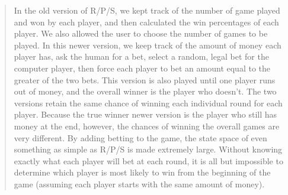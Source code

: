 \documentclass{article}
\begin{document}
\begin{enumerate}
\begin{quote}
In the old version of R/P/S, we kept track of the number of game played and won by each player, and then calculated the win percentages of each player. We also allowed the user to choose the number of games to be played. In this newer version, we keep track of the amount of money each player has, ask the human for a bet, select a random, legal bet for the computer player, then force each player to bet an amount equal to the greater of the two bets. This version is also played until one player runs out of money, and the overall winner is the player who doesn't.\newline
The two versions retain the same chance of winning each individual round for each player. Because the true winner newer version is the player who still has money at the end, however, the chances of winning the overall games are very different. By adding betting to the game, the state space of even something as simple as R/P/S is made extremely large. Without knowing exactly what each player will bet at each round, it is all but impossible to determine which player is most likely to win from the beginning of the game (assuming each player starts with the same amount of money).
\end{quote}

\end{enumerate}
\end{document}

